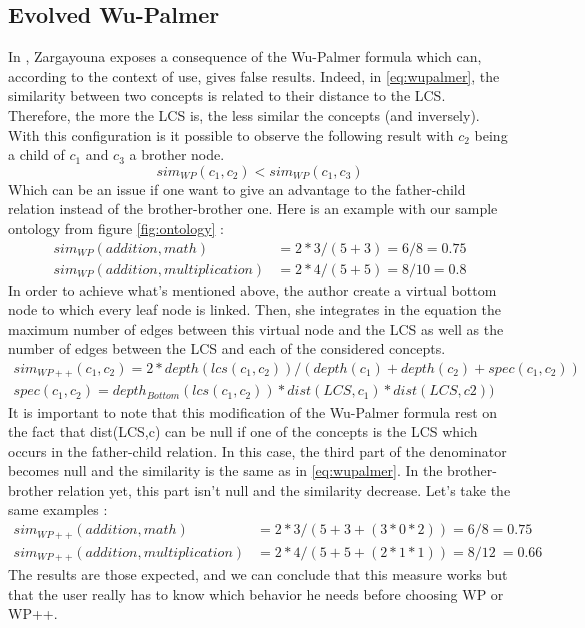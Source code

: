 \subsection{Evolved Wu-Palmer} %
\label{ssub:evolved_wu_palmer}
In \cite{zargayouna2004mesure}, Zargayouna exposes a consequence of the Wu-Palmer formula which can, according to the context of use, gives false results. Indeed, in \eqref{eq:wupalmer}, the similarity between two concepts is related to their distance to the LCS. Therefore, the more  the LCS is, the less similar the concepts (and inversely). With this configuration is it possible to observe the following result with $c_2$ being a child of $c_1$ and $c_3$ a brother node.
\begin{equation}
\label{eq:pbWPpp}
sim_{WP}(c_1, c_2) < sim_{WP}(c_1, c_3)
\end{equation}
Which can be an issue if one want to give an advantage to the father-child relation instead of the brother-brother one. Here is an example with our sample ontology from figure \ref{fig:ontology} :
\begin{align}
\label{eq:obsWPp}
sim_{WP}(addition, math)& = 2*3 / (5 + 3) = 6/8 = 0.75\\
sim_{WP}(addition, multiplication)& = 2*4 / (5 + 5) = 8/10 = 0.8
\end{align}
In order to achieve what's mentioned above, the author create a virtual bottom node to which every leaf node is linked. Then, she integrates in the equation the maximum number of edges between this virtual node and the LCS as well as the number of edges between the LCS and each of the considered concepts. 
\begin{align}
\label{eq:WPpp}
sim_{WP++}(c_1, c_2) = 2*depth(lcs(c_1,c_2)) / (depth(c_1) + depth(c_2) + spec(c_1,c_2))\\
spec(c_1,c_2) = depth_{Bottom}(lcs(c_1,c_2))*dist(LCS, c_1)*dist(LCS,c2))
\end{align}
It is important to note that this modification of the Wu-Palmer formula rest on the fact that dist(LCS,c) can be null if one of the concepts is the LCS which occurs in the father-child relation. In this case, the third part of the denominator becomes null and the similarity is the same as in \eqref{eq:wupalmer}. In the brother-brother relation yet, this part isn't null and the similarity decrease. Let's take the same examples :
\begin{align}
\label{eq:resultWPp}
sim_{WP++}(addition, math)& = 2*3 / (5 + 3 + (3*0*2)) = 6/8 = 0.75\\
sim_{WP++}(addition, multiplication)& = 2*4 / (5 + 5 + (2*1*1)) = 8/12 ~= 0.66 
\end{align}
The results are those expected, and we can conclude that this measure works but that the user really has to know which behavior he needs before choosing WP or WP++.


